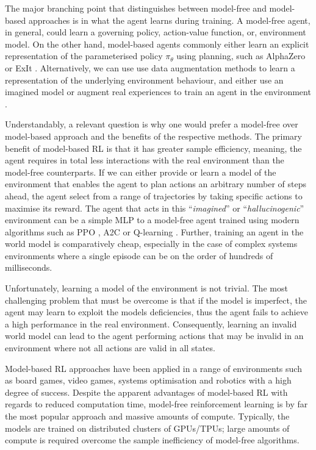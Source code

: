 The major branching point that distinguishes between model-free and model-based approaches is in what the agent learns during training. A model-free agent, in general, could learn a governing policy, action-value function, or, environment model. On the other hand, model-based agents commonly either learn an explicit representation of the parameterised policy $\pi_\theta$ using planning, such as AlphaZero \cite{silver2017mastering} or ExIt \cite{anthony2017thinking}. Alternatively, we can use use data augmentation methods to learn a representation of the underlying environment behaviour, and either use an imagined model or augment real experiences to train an agent in the environment \cite{kaiser2020modelbased, feinberg2018modelbased, freeman2019learning}.

Understandably, a relevant question is why one would prefer a model-free over model-based approach and the benefits of the respective methods. The primary benefit of model-based RL is that it has greater sample efficiency, meaning, the agent requires in total less interactions with the real environment than the model-free counterparts. If we can either provide or learn a model of the environment that enables the agent to plan actions an arbitrary number of steps ahead, the agent select from a range of trajectories by taking specific actions to maximise its reward. The agent that acts in this ``\textit{imagined}'' or ``\textit{hallucinogenic}'' environment can be a simple MLP \cite{ha2018worldmodels} to a model-free agent trained using modern algorithms such as PPO \cite{schulman2017proximal}, A2C \cite{mnih2016asynchronous} or Q-learning \cite{watkins1992q, mnih2013playing}. Further, training an agent in the world model is comparatively cheap, especially in the case of complex systems environments where a single episode can be on the order of hundreds of milliseconds.

Unfortunately, learning a model of the environment is not trivial. The most challenging problem that must be overcome is that if the model is imperfect, the agent may learn to exploit the models deficiencies, thus the agent fails to achieve a high performance in the real environment. Consequently, learning an invalid world model can lead to the agent performing actions that may be invalid in an environment where not all actions are valid in all states.

Model-based RL approaches have been applied in a range of environments such as board games, video games, systems optimisation and robotics with a high degree of success. Despite the apparent advantages of model-based RL with regards to reduced computation time, model-free reinforcement learning is by far the most popular approach and massive amounts of compute. Typically, the models are trained on distributed clusters of GPUs/TPUs; large amounts of compute is required overcome the sample inefficiency of model-free algorithms.

